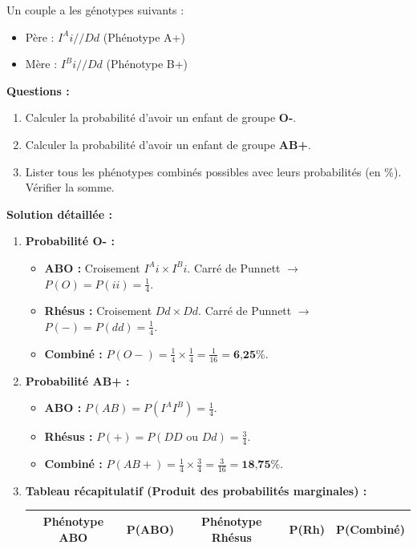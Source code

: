\documentclass[11pt]{article}
\begin{document}
\begin{exoresolu}
Un couple a les génotypes suivants :
\begin{itemize}
    \item Père : $I^A i // Dd$ (Phénotype A+)
    \item Mère : $I^B i // Dd$ (Phénotype B+)
\end{itemize}
\textbf{Questions :}
\begin{enumerate}
    \item Calculer la probabilité d'avoir un enfant de groupe \textbf{O-}.
    \item Calculer la probabilité d'avoir un enfant de groupe \textbf{AB+}.
    \item Lister tous les phénotypes combinés possibles avec leurs probabilités (en \%). Vérifier la somme.
\end{enumerate}
\tcblower
\textbf{Solution détaillée :}
\begin{enumerate}
    \item \textbf{Probabilité O- :}
    \begin{itemize}
        \item \textbf{ABO :} Croisement $I^A i \times I^B i$. Carré de Punnett $\rightarrow$ $P(O) = P(ii) = \frac{1}{4}$.
        \item \textbf{Rhésus :} Croisement $Dd \times Dd$. Carré de Punnett $\rightarrow$ $P(-) = P(dd) = \frac{1}{4}$.
        \item \textbf{Combiné :} $P(O-) = \frac{1}{4} \times \frac{1}{4} = \frac{1}{16} = \textbf{6,25\%}$.
    \end{itemize}
    \item \textbf{Probabilité AB+ :}
    \begin{itemize}
        \item \textbf{ABO :} $P(AB) = P(I^A I^B) = \frac{1}{4}$.
        \item \textbf{Rhésus :} $P(+) = P(DD \text{ ou } Dd) = \frac{3}{4}$.
        \item \textbf{Combiné :} $P(AB+) = \frac{1}{4} \times \frac{3}{4} = \frac{3}{16} = \textbf{18,75\%}$.
    \end{itemize}
    \item \textbf{Tableau récapitulatif (Produit des probabilités marginales) :}
    \begin{center}
    \begin{tabular}{|c|c|c|c|c|}
        \hline
        \textbf{Phénotype ABO} & \textbf{P(ABO)} & \textbf{Phénotype Rhésus} & \textbf{P(Rh)} & \textbf{P(Combiné)} \\ \hline

\end{tabular}
\end{center}
\end{enumerate}
\end{exoresolu}
\end{document}

